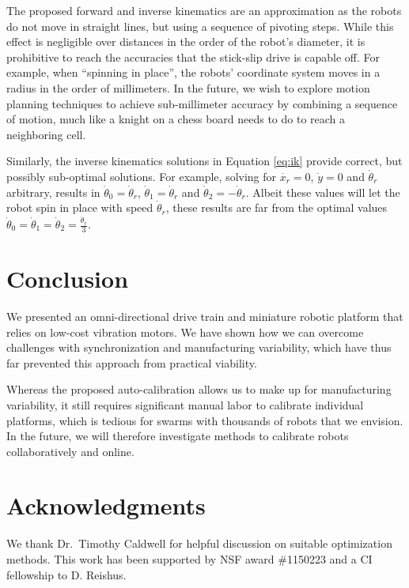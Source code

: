 \documentclass[letterpaper, 10pt, conference]{ieeeconf}
\begin{document}
The proposed forward and inverse kinematics are an approximation as the robots do not move in straight lines, but using a sequence of pivoting steps. While this effect is negligible over distances in the order of the robot's diameter, it is prohibitive to reach the accuracies that the stick-slip drive is capable off. For example, when ``spinning in place'', the robots' coordinate system moves in a radius in the order of millimeters. In the future, we wish to explore motion planning techniques to achieve sub-millimeter accuracy by combining a sequence of motion, much like a knight on a chess board needs to do to reach a neighboring cell. 

Similarly, the inverse kinematics solutions in Equation \ref{eq:ik} provide correct, but possibly sub-optimal solutions. For example, solving for $\dot{x_r}=0$, $\dot{y}=0$ and $\dot{\theta}_r$ arbitrary, results in $\dot{\theta}_0=\dot{\theta}_r$, $\dot{\theta}_1=\dot{\theta}_r$ and $\dot{\theta}_2=-\dot{\theta}_r$. Albeit these values will let the robot spin in place with speed $\dot{\theta}_r$, these results are far from the optimal values $\dot{\theta}_0=\dot{\theta}_1=\dot{\theta}_2=\frac{\dot{\theta}_r}{3}$. 

\section{Conclusion}
We presented an omni-directional drive train and miniature robotic platform that relies on low-cost vibration motors. We have shown how we can overcome challenges with synchronization and manufacturing variability, which have thus far prevented this approach from practical viability. 

Whereas the proposed auto-calibration allows us to make up for manufacturing variability, it still requires significant manual labor to calibrate individual platforms, which is tedious for swarms with thousands of robots that we envision. In the future, we will therefore investigate methods to calibrate robots collaboratively and online.  

\section*{Acknowledgments} We thank Dr.\ Timothy Caldwell for helpful discussion on suitable optimization methods. 
This work has been supported by NSF award \#1150223 and a CI fellowship to D. Reishus.




\end{document}
